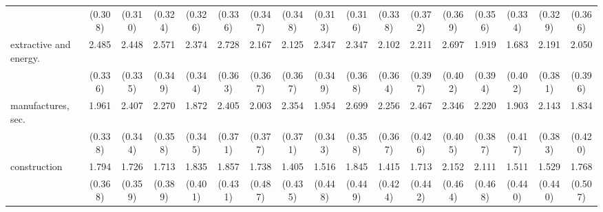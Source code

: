 {\begin{tabular}{l*{16}{c}}
                    &     (0.308)         &     (0.310)         &     (0.324)         &     (0.326)         &     (0.336)         &     (0.347)         &     (0.348)         &     (0.313)         &     (0.316)         &     (0.338)         &     (0.372)         &     (0.369)         &     (0.356)         &     (0.334)         &     (0.329)         &     (0.366)         \\
[1em]
extractive and energy.&       2.485\sym{***}&       2.448\sym{***}&       2.571\sym{***}&       2.374\sym{***}&       2.728\sym{***}&       2.167\sym{***}&       2.125\sym{***}&       2.347\sym{***}&       2.347\sym{***}&       2.102\sym{***}&       2.211\sym{***}&       2.697\sym{***}&       1.919\sym{***}&       1.683\sym{***}&       2.191\sym{***}&       2.050\sym{***}\\
                    &     (0.336)         &     (0.335)         &     (0.349)         &     (0.344)         &     (0.363)         &     (0.367)         &     (0.367)         &     (0.349)         &     (0.368)         &     (0.364)         &     (0.397)         &     (0.402)         &     (0.394)         &     (0.402)         &     (0.381)         &     (0.396)         \\
[1em]
manufactures, sec.  &       1.961\sym{***}&       2.407\sym{***}&       2.270\sym{***}&       1.872\sym{***}&       2.405\sym{***}&       2.003\sym{***}&       2.354\sym{***}&       1.954\sym{***}&       2.699\sym{***}&       2.256\sym{***}&       2.467\sym{***}&       2.346\sym{***}&       2.220\sym{***}&       1.903\sym{***}&       2.143\sym{***}&       1.834\sym{***}\\
                    &     (0.338)         &     (0.344)         &     (0.358)         &     (0.345)         &     (0.371)         &     (0.377)         &     (0.371)         &     (0.343)         &     (0.358)         &     (0.367)         &     (0.426)         &     (0.405)         &     (0.387)         &     (0.417)         &     (0.383)         &     (0.420)         \\
[1em]
construction        &       1.794\sym{***}&       1.726\sym{***}&       1.713\sym{***}&       1.835\sym{***}&       1.857\sym{***}&       1.738\sym{***}&       1.405\sym{**} &       1.516\sym{***}&       1.845\sym{***}&       1.415\sym{***}&       1.713\sym{***}&       2.152\sym{***}&       2.111\sym{***}&       1.511\sym{***}&       1.529\sym{***}&       1.768\sym{***}\\
                    &     (0.368)         &     (0.359)         &     (0.389)         &     (0.401)         &     (0.431)         &     (0.487)         &     (0.435)         &     (0.448)         &     (0.449)         &     (0.424)         &     (0.442)         &     (0.464)         &     (0.468)         &     (0.440)         &     (0.440)         &     (0.507)         \\

\end{tabular}}
